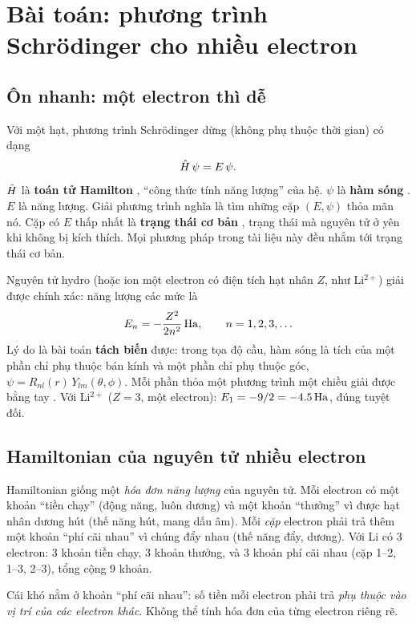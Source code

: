 \chapter{Bài toán: phương trình Schrödinger cho nhiều electron}
\label{ch:baitoan}

\section{Ôn nhanh: một electron thì dễ}

Với một hạt, phương trình Schrödinger dừng (không phụ thuộc thời gian) có dạng
\[
\hat H\,\psi = E\,\psi .
\]
$\hat H$ là \textbf{toán tử Hamilton} , ``công thức tính năng lượng'' của hệ. $\psi$ là \textbf{hàm sóng} . $E$ là năng lượng. Giải phương trình nghĩa là tìm những cặp $(E,\psi)$ thỏa mãn nó. Cặp có $E$ thấp nhất là \textbf{trạng thái cơ bản} , trạng thái mà nguyên tử ở yên khi không bị kích thích. Mọi phương pháp trong tài liệu này đều nhắm tới trạng thái cơ bản.

Nguyên tử hydro (hoặc ion một electron có điện tích hạt nhân $Z$, như Li$^{2+}$) giải được chính xác: năng lượng các mức là
\[
E_n = -\frac{Z^2}{2n^2}\,\mathrm{Ha}, \qquad n = 1, 2, 3, \ldots
\]
Lý do là bài toán \textbf{tách biến} được: trong tọa độ cầu, hàm sóng là tích của một phần chỉ phụ thuộc bán kính và một phần chỉ phụ thuộc góc, $\psi = R_{nl}(r)\,Y_{lm}(\theta,\phi)$. Mỗi phần thỏa một phương trình một chiều giải được bằng tay \cite{Griffiths2018}. Với Li$^{2+}$ ($Z=3$, một electron): $E_1 = -9/2 = -4.5\,\mathrm{Ha}$, đúng tuyệt đối.

\section{Hamiltonian của nguyên tử nhiều electron}

\begin{eli5}
Hamiltonian giống một \emph{hóa đơn năng lượng} của nguyên tử. Mỗi electron có một khoản ``tiền chạy'' (động năng, luôn dương) và một khoản ``thưởng'' vì được hạt nhân dương hút (thế năng hút, mang dấu âm). Mỗi \emph{cặp} electron phải trả thêm một khoản ``phí cãi nhau'' vì chúng đẩy nhau (thế năng đẩy, dương). Với Li có 3 electron: 3 khoản tiền chạy, 3 khoản thưởng, và 3 khoản phí cãi nhau (cặp 1--2, 1--3, 2--3), tổng cộng 9 khoản.

Cái khó nằm ở khoản ``phí cãi nhau'': số tiền mỗi electron phải trả \emph{phụ thuộc vào vị trí của các electron khác}. Không thể tính hóa đơn của từng electron riêng rẽ.
\end{eli5}

